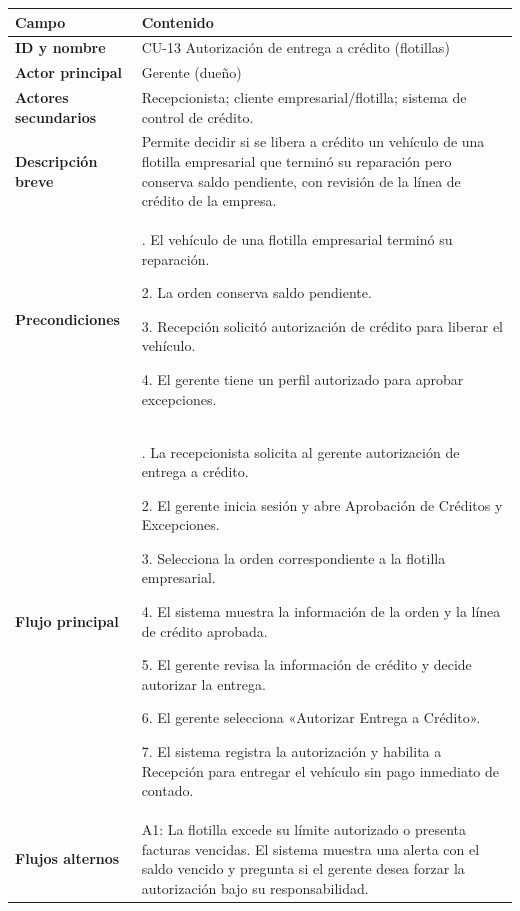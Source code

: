 {\def\LTcaptype{none} %
\begin{longtable}[]{@{}
  >{\raggedright\arraybackslash}p{}
  >{\raggedright\arraybackslash}p{}@{}}
\toprule\noalign{}
\begin{minipage}[b]{\linewidth}\raggedright
\textbf{Campo}
\end{minipage} & \begin{minipage}[b]{\linewidth}\raggedright
\textbf{Contenido}
\end{minipage} \\
\midrule\noalign{}
\endhead
\bottomrule\noalign{}
\endlastfoot
\textbf{ID y nombre} & CU-13 Autorización de entrega a crédito
(flotillas) \\
\textbf{Actor principal} & Gerente (dueño) \\
\textbf{Actores secundarios} & Recepcionista; cliente
empresarial/flotilla; sistema de control de crédito. \\
\textbf{Descripción breve} & Permite decidir si se libera a crédito un
vehículo de una flotilla empresarial que terminó su reparación pero
conserva saldo pendiente, con revisión de la línea de crédito de la
empresa. \\
\textbf{Precondiciones} & 1. El vehículo de una flotilla empresarial
terminó su reparación.

2. La orden conserva saldo pendiente.

3. Recepción solicitó autorización de crédito para liberar el vehículo.

4. El gerente tiene un perfil autorizado para aprobar excepciones. \\
\textbf{Flujo principal} & 1. La recepcionista solicita al gerente
autorización de entrega a crédito.

2. El gerente inicia sesión y abre Aprobación de Créditos y Excepciones.

3. Selecciona la orden correspondiente a la flotilla empresarial.

4. El sistema muestra la información de la orden y la línea de crédito
aprobada.

5. El gerente revisa la información de crédito y decide autorizar la
entrega.

6. El gerente selecciona «Autorizar Entrega a Crédito».

7. El sistema registra la autorización y habilita a Recepción para
entregar el vehículo sin pago inmediato de contado. \\
\textbf{Flujos alternos} & \begin{minipage}[t]{\linewidth}\raggedright
A1: La flotilla excede su límite autorizado o presenta facturas
vencidas. El sistema muestra una alerta con el saldo vencido y pregunta
si el gerente desea forzar la autorización bajo su responsabilidad.


\end{minipage}
\end{longtable}}

